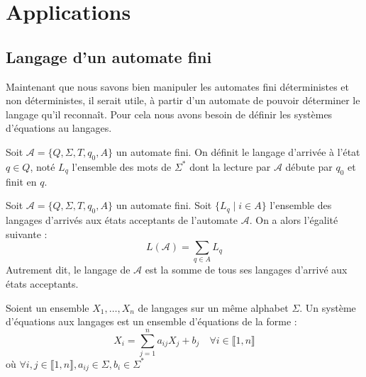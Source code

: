 
\section{Applications}

\subsection{Langage d'un automate fini}

Maintenant que nous savons bien manipuler les automates fini déterministes et non déterministes, il serait utile, 
à partir d'un automate de pouvoir déterminer le langage qu'il reconnaît. Pour cela nous avons besoin de définir 
les systèmes d'équations au langages.


\begin{definition}
    Soit $ \mathcal{A} = \{Q, \Sigma, T, q_0, A\}$ un automate fini. On définit le langage d'arrivée à l'état $ q \in Q$, 
    noté $ L_q$ l'ensemble des mots de $ \Sigma^*$ dont la lecture par $ \mathcal{A}$ débute par $q_0$ et finit en $q$. 
\end{definition}

\begin{proposition}
    Soit $ \mathcal{A} = \{Q, \Sigma, T, q_0, A\}$ un automate fini. Soit $\{L_q \; | \; i \in A \}$ 
    l'ensemble des langages d'arrivés aux états acceptants de l'automate $ \mathcal{A}$. On a alors l'égalité suivante : 
        \[ L( \mathcal{A}) = \sum_{q \in A} L_q \]
    Autrement dit, le langage de $ \mathcal{A}$ est la somme de tous ses langages d'arrivé aux états acceptants. 
\end{proposition}

\begin{definition}
    Soient un ensemble $X_1, \dots, X_n$ de langages sur un même alphabet $\Sigma$. 
    Un système d'équations aux langages est un ensemble d'équations de la forme : 
        \[ X_i = \sum_{j=1}^{n} a_{ij} X_j + b_j \quad \forall i \in \llbracket 1, n \rrbracket \] 
    où $ \forall i,j \in \llbracket 1, n \rrbracket, a_{ij} \in \Sigma, b_i \in \Sigma^*$
\end{definition}

